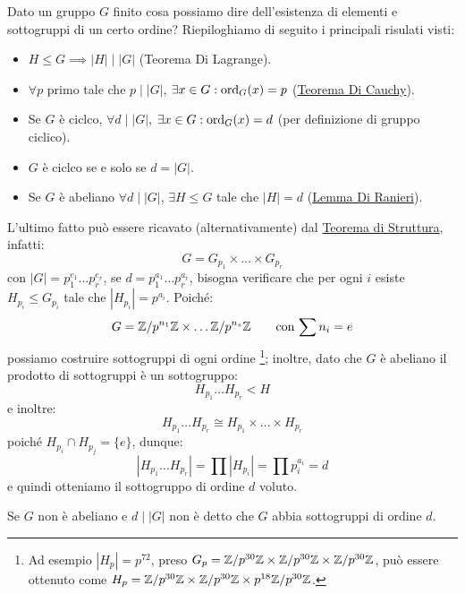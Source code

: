 \documentclass[11pt]{scrartcl}
\begin{document}
\begin{remark}
    Dato un gruppo $G$ finito cosa possiamo dire dell'esistenza di elementi e sottogruppi di un certo ordine? Riepiloghiamo di seguito i principali risulati visti:
        \begin{itemize}
            \item $H \leqslant G \implies |H| \mid |G|$ (Teorema Di Lagrange).
            \item $\forall p$ primo tale che $p \mid |G|$, $\exists x \in G : \operatorname{ord}_G(x) = p$ (\hyperref[p:Cauchy]{Teorema Di Cauchy}).
            \item Se $G$ è ciclco, $\forall d \mid |G|$, $\exists x \in G : \operatorname{ord}_G(x) = d$ (per definizione di gruppo ciclico).
            \item $G$ è ciclco se e solo se $d = |G|$.
            \item Se $G$ è abeliano $\forall d \mid |G|$, $\exists H \leqslant G$ tale che $|H| = d$ (\hyperref[davide]{Lemma Di Ranieri}).
        \end{itemize}
\end{remark}
L'ultimo fatto può essere ricavato (alternativamente) dal \hyperref[t:struttura]{Teorema di Struttura}, infatti:
    \[ G = G_{p_1} \times \ldots \times G_{p_r}
        \]
con $|G| = p_1^{e_1}\ldots p_r^{e_r}$, se $d = p_1^{a_1}\ldots p_r^{a_r}$, bisogna verificare che per ogni $i$ esiste $H_{p_i} \leqslant G_{p_i}$ tale che $|H_{p_i}| = p^{a_i}$.
Poiché:
    \[ G = \mathbb{Z}/{p^{n_1}}\mathbb{Z} \times \ldots \mathbb{Z}/{p^{n_s}}\mathbb{Z} \qquad \text{con $\sum n_i = e$}
        \]
possiamo costruire sottogruppi di ogni ordine \footnote{Ad esempio $|H_p| = p^{72}$, preso $G_p = \mathbb{Z}/{p^{30}}\mathbb{Z} \times \mathbb{Z}/{p^{30}}\mathbb{Z} \times \mathbb{Z}/{p^{30}}\mathbb{Z}$, può essere ottenuto come $H_p = \mathbb{Z}/{p^{30}}\mathbb{Z} \times \mathbb{Z}/{p^{30}}\mathbb{Z} \times p^{18} \mathbb{Z}/{p^{30}}\mathbb{Z}$.};
inoltre, dato che $G$ è abeliano il prodotto di sottogruppi è un sottogruppo:
    \[ H_{p_1}\ldots H_{p_r} < H
        \]
e inoltre:
    \[ H_{p_1}\ldots H_{p_r} \cong H_{p_1} \times \ldots \times H_{p_r}
        \]
poiché $H_{p_i} \cap H_{p_j} = \{e\}$, dunque:
    \[ |H_{p_1}\ldots H_{p_r}| = \prod |H_{p_i}| = \prod p_{i}^{a_i} = d
        \]
e quindi otteniamo il sottogruppo di ordine $d$ voluto.
    
\begin{remark}
    Se $G$ non è abeliano e $d \mid |G|$ non è detto che $G$ abbia sottogruppi di ordine $d$.
\end{remark}
\end{document}
